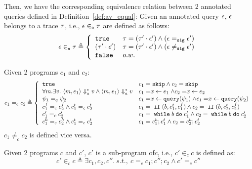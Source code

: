 %
Then, we have the corresponding equivalence relation between 2 annotated queries defined in Definition~\ref{def:av_equal}:
%
%
%
%
%
Given an annotated query $\mathtt{\epsilon}$, $\mathtt{\epsilon}$ belongs to a trace $\mathtt{\tau}$, i.e., $\mathtt{\epsilon} \in_{\mathtt{e}} \mathtt{\tau}$ are defined as follows:
\begin{equation}
    \event \eventin \trace  
    \triangleq \left\{
    \begin{array}{ll} 
      \etrue                  & \trace =  (\trace' \cdot \event') \land (\event \sigeq \event') \\
      (\trace' \cdot \event') & \trace =  (\trace' \cdot \event') \land (\event \signeq \event') \\ 
      \efalse                 & o.w.
    \end{array}
    \right.
  \end{equation}
%
\begin{defn}
%
\label{def:aq_prog}
Given 2 programs $c_1$ and $c_2$:
\[
c_1 =_{c} c_2
 \triangleq 
 \left\{
    \begin{array}{ll} 
      \etrue        
      & c_1 = \eskip \land c_2 = \eskip
      \\ 
      \forall m. \exists v. ~ \config{m, \expr_1} \aarrow^{*} v \land \config{m, \expr_1} \aarrow^{*} v     
      & c_1 = \assign{x}{\expr_1} \land c_2 = \assign{x}{\expr_2} 
      \\ 
      \qexpr_1 =_{q} \qexpr_2       
      & c_1 = \assign{x}{\query(\qexpr_1)} \land c_1 = \assign{x}{\query(\qexpr_2)} 
      \\
      c_1^f =_{c} c_2^f \land c_1^t =_{c} c_2^t
      & c_1 = \eif(b, c_1^t, c_1^f) \land c_2 = \eif(b, c_2^t, c_2^f)
      \\ 
      c_1' =_{c} c_2'         
      & c_1 = \ewhile b \edo c_1' \land c_2 = \ewhile b \edo c_2'
      \\ 
      c_1^h =_{c} c_2^h \land c_1^t =_{c} c_2^t
      & c_1 = c_1^h;c_1^t \land c_2 = c_2^h;c_2^t 
    \end{array}
    \right.
\]
%
$c_1 \neq_{c} c_2$  is defined vice versa.
%
\end{defn}
%
Given 2 programs $c$ and $c'$, $c'$ is a sub-program of$c$, i.e., $c' \in_{c} c$ is defined as:
\begin{equation}
c' \in_{c} c \triangleq \exists c_1, c_2, c''. ~ s.t.,~
c =_{c} c_1; c''; c_2 \land c' =_{c} c''
\end{equation} 
%

